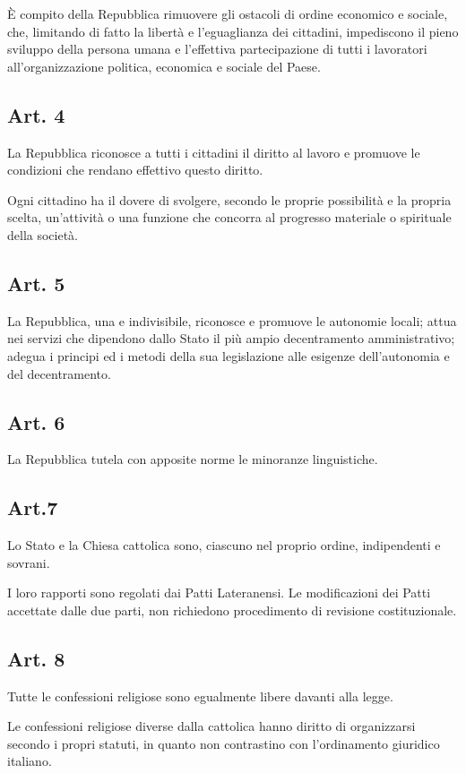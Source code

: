 \documentclass{article}
\begin{document}
 È compito della Repubblica rimuovere gli ostacoli di ordine economico e sociale, che, limitando di fatto la libertà e l'eguaglianza dei cittadini, impediscono il pieno sviluppo della persona umana e l'effettiva partecipazione di tutti i lavoratori all'organizzazione politica, economica e sociale del Paese.

\subsection{ Art. 4}
 La Repubblica riconosce a tutti i cittadini il diritto al lavoro e promuove le condizioni che rendano effettivo questo diritto.

 Ogni cittadino ha il dovere di svolgere, secondo le proprie possibilità e la propria scelta, un'attività o una funzione che concorra al progresso materiale o spirituale della società.

\subsection{ Art. 5}
 La Repubblica, una e indivisibile, riconosce e promuove le autonomie locali; attua nei servizi che dipendono dallo Stato il più ampio decentramento amministrativo; adegua i principi ed i metodi della sua legislazione alle esigenze dell'autonomia e del decentramento.

\subsection{ Art. 6}
 La Repubblica tutela con apposite norme le minoranze linguistiche.

\subsection{ Art.7}
 Lo Stato e la Chiesa cattolica sono, ciascuno nel proprio ordine, indipendenti e sovrani.

 I loro rapporti sono regolati dai Patti Lateranensi. Le modificazioni dei Patti accettate dalle due parti, non richiedono procedimento di revisione costituzionale.

\subsection{ Art. 8}
 Tutte le confessioni religiose sono egualmente libere davanti alla legge.

 Le confessioni religiose diverse dalla cattolica hanno diritto di organizzarsi secondo i propri statuti, in quanto non contrastino con l'ordinamento giuridico italiano.
\end{document}
